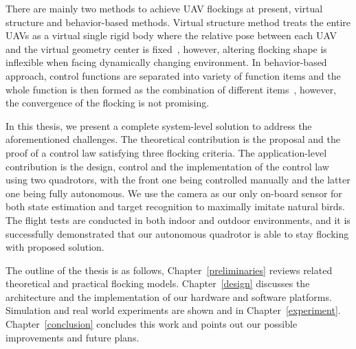 There are mainly two methods to achieve UAV flockings at present, virtual structure and behavior-based methods. Virtual structure method treats the entire UAVs as a virtual single rigid body where the relative pose between each UAV and the virtual geometry center is fixed~\cite{Virtual2008,Askari2015,Cai2012}, however, altering flocking shape is inflexible when facing dynamically changing environment. In behavior-based approach, control functions are separated into variety of function items and the whole function is then formed as the combination of different items~\cite{Zhang2018,Martin2014,Vicsek2018}, however, the convergence of the flocking is not promising.

In this thesis, we present a complete system-level solution to address the aforementioned challenges. The theoretical contribution is the proposal and the proof of a control law satisfying three flocking criteria. The application-level contribution is the design, control and the implementation of the control law using two quadrotors, with the front one being controlled manually and the latter one being fully autonomous. We use the camera as our only on-board sensor for both state estimation and target recognition to maximally imitate natural birds. The flight tests are conducted in both indoor and outdoor environments, and it is successfully demonstrated that our autonomous quadrotor is able to stay flocking with proposed solution.

The outline of the thesis is as follows, Chapter~\ref{preliminaries} reviews related theoretical and practical flocking models. Chapter~\ref{design} discusses the architecture and the implementation of our hardware and software platforms. Simulation and real world experiments are shown and in Chapter~\ref{experiment}. Chapter~\ref{conclusion} concludes this work and points out our possible improvements and future plans.

\newpage
